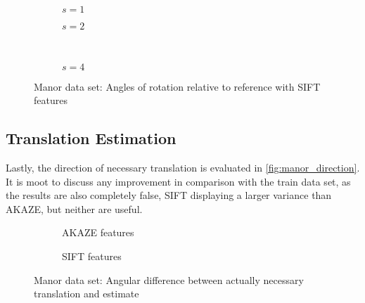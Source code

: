 \begin{figure}
   \begin{subfigure}{.5\linewidth}
      \centering      
      
      \label{fig:manor_SIFT_rotation_1}
      \caption{$s=1$}
   \end{subfigure}
   \quad
   \begin{subfigure}{.5\linewidth}
      \centering      
      
      \label{fig:manor_SIFT_rotation_2}
      \caption{$s=2$}
   \end{subfigure}\\[3ex]
   \begin{subfigure}{\linewidth}
      \centering      
      
      \label{fig:manor_SIFT_rotation_4}
      \caption{$s=4$}
   \end{subfigure}
   \caption[Manor data: Rotation SIFT]{Manor data set: Angles of rotation relative to reference with
   SIFT features}
   \label{fig:manor_SIFT_rotation}
\end{figure}

\subsection{Translation Estimation}

Lastly, the direction of necessary translation is evaluated in
\autoref{fig:manor_direction}. It is moot to discuss any improvement in
comparison with the train data set, as the results are also completely false,
SIFT displaying a larger variance than AKAZE, but neither are useful.

\begin{figure}[h]
   \begin{subfigure}{.5\linewidth}
      \centering      
      
      \caption{AKAZE features}
      \label{fig:manor_KAZE_direction}
   \end{subfigure}
   \begin{subfigure}{.5\linewidth}
      \centering      
      
      \caption{SIFT features}
      \label{fig:manor_SIFT_direction}
   \end{subfigure}
   \caption[Manor data: Translation]{Manor data set: Angular difference between actually necessary translation and estimate}
   \label{fig:manor_direction}
\end{figure}

\FloatBarrier

